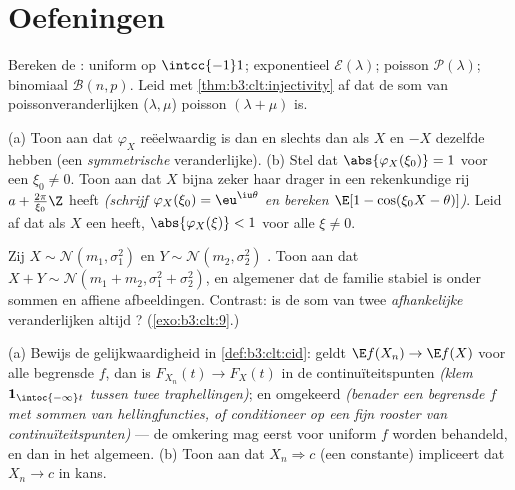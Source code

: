 \section{Oefeningen}

\begin{exercise}[$\star$]\label{exo:b3:clt:1}
Bereken de : uniform op $\intcc{-1}1$;
exponentieel $\mathcal E(\lambda)$; poisson $\mathcal
P(\lambda)$; binomiaal $\mathcal B(n, p)$. Leid met
\cref{thm:b3:clt:injectivity} af dat de som van 
poissonveranderlijken ($\lambda, \mu$) poisson $(\lambda + \mu)$
is.
\end{exercise}

\begin{exercise}[$\star\star$]\label{exo:b3:clt:2}
(a) Toon aan dat $\varphi_X$ reëelwaardig is dan en slechts dan
als $X$ en $-X$ dezelfde  hebben (een
\emph{symmetrische} veranderlijke).
(b) Stel dat $\abs{\varphi_X(\xi_0)} = 1$ voor een $\xi_0 \neq
0$. Toon aan dat $X$ bijna zeker haar drager in een rekenkundige
rij $a + \frac{2\pi}{\xi_0}\Z$ heeft \emph{(schrijf
$\varphi_X(\xi_0) = \eu^{\iu\theta}$ en bereken $\E[1 -
\cos(\xi_0X - \theta)]$)}. Leid af dat als $X$ een 
heeft, $\abs{\varphi_X(\xi)} < 1$ voor alle $\xi \neq 0$.
\end{exercise}

\begin{exercise}[$\star\star$]\label{exo:b3:clt:3}
Zij $X \sim \mathcal N(m_1, \sigma_1^2)$ en $Y \sim \mathcal
N(m_2, \sigma_2^2)$ . Toon aan dat $X + Y \sim
\mathcal N(m_1 + m_2, \sigma_1^2 + \sigma_2^2)$, en algemener dat
de  familie stabiel is onder  sommen en
affiene afbeeldingen. Contrast: is de som van twee
\emph{afhankelijke}  veranderlijken altijd ?
(\cref{exo:b3:clt:9}.)
\end{exercise}

\begin{exercise}[$\star\star$]\label{exo:b3:clt:4}
(a) Bewijs de gelijkwaardigheid in \cref{def:b3:clt:cid}: geldt
$\E f(X_n) \to \E f(X)$ voor alle begrensde  $f$, dan is
$F_{X_n}(t) \to F_X(t)$ in de continuïteitspunten \emph{(klem
$\mathbf 1_{\intoc{-\infty}t}$ tussen twee 
traphellingen)}; en omgekeerd \emph{(benader een begrensde
 $f$ met sommen van hellingfuncties, of conditioneer op
een fijn rooster van continuïteitspunten)} --- de omkering mag
eerst voor uniform  $f$ worden behandeld, en dan in het
algemeen.
(b) Toon aan dat $X_n \Rightarrow c$ (een constante) impliceert
dat $X_n \to c$ in kans.
\end{exercise}


